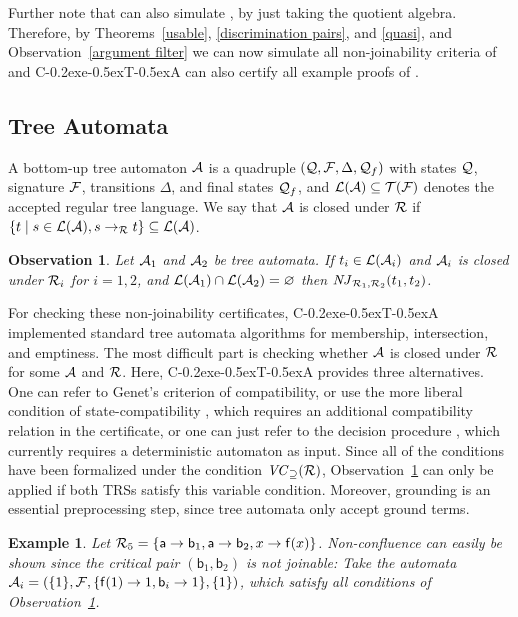 \documentclass[a4paper]{easychair}
\newtheorem{observation}[theorem]{Observation}
\newtheorem{example}[theorem]{Example}
\newcommand\ceta{\textsf{C\kern-0.2exe\kern-0.5exT\kern-0.5exA}\xspace}
\newcommand\TT{{\cal T}}
\newcommand\LL{{\cal L}}
\newcommand\AAA{{\cal A}}
\newcommand\QQ{{\cal Q}}
\newcommand\final{{\cal Q}_{f}}
\newcommand\FF{{\cal F}}
\newcommand\RR{{\cal R}}
\newcommand\njin[3]{\mathit{NJ}_{#1}(#2,#3)}
\newcommand\nj[4]{\njin{#1,#2}{#3}{#4}}
\newcommand\m[1]{\mathsf{#1}}
\newcommand\rObs[1]{Observation~\ref{#1}}
\newcommand{\vcsubset}[1]{\mathit{VC}_{\supseteq}(#1)}
\begin{document}
Further note that \cite[Corollary 6]{Aoto} can also simulate \cite[Theorem 5]{Aoto}, by just
taking the quotient algebra. Therefore, by Theorems~\ref{usable}, \ref{discrimination pairs}, and 
\ref{quasi}, and \rObs{argument filter}
we can now simulate all non-joinability criteria of \cite{Aoto} and \ceta can also certify all 
example proofs of \cite{Aoto}.

\subsection{Tree Automata}

A bottom-up tree automaton $\AAA$ is a quadruple $(\QQ,\FF,\Delta,\final)$ 
with states $\QQ$, signature $\FF$,
transitions $\Delta$, and final states $\final$, and $\LL(\AAA) \subseteq \TT(\FF)$ 
denotes the accepted regular tree language. We say that $\AAA$ is closed under $\RR$ if
$\{t \mid s \in \LL(\AAA), s \to_\RR t\} \subseteq \LL(\AAA)$.

\begin{observation}
\label{automata}
Let $\AAA_1$ and $\AAA_2$ be tree automata.
If $t_i \in \LL(\AAA_i)$ and $\AAA_i$ is closed under $\RR_i$ for $i = 1,2$, and
$\LL(\AAA_1) \cap \LL(\AAA_2) = \varnothing$ then $\nj{\RR_1}{\RR_2}{t_1}{t_2}$.
\end{observation}

For checking these non-joinability certificates, \ceta implemented standard tree automata algorithms
for membership, intersection, and emptiness. The most difficult part is checking whether
$\AAA$ is closed under $\RR$ for some $\AAA$ and $\RR$.
Here, \ceta provides three alternatives. One can refer to Genet's criterion 
of compatibility, or use the more liberal condition of state-compatibility \cite{BFRT-LATA14}, which 
requires an additional compatibility relation in the certificate, or one can just refer to
the decision procedure \cite{BFRT-LATA14}, which currently requires a deterministic automaton as input.
Since all of the conditions have been formalized under the condition $\vcsubset{\RR}$, 
\rObs{automata} can only be applied if both TRSs satisfy this variable condition.
Moreover, grounding is an essential preprocessing step, since tree automata only accept ground
terms.

\begin{example}
\label{aut ex}
Let $\RR_5 = \{\m a \to \m b_1, \m a \to \m b_2, x \to \m f(x)\}$.
Non-confluence can easily be shown since the critical pair $(\m b_1, \m b_2)$ is not joinable:
Take the automata $\AAA_i = (\{1\}, \FF, \{\m f(1) \to 1, \m b_i \to 1\}, \{1\})$, which
satisfy all conditions of \rObs{automata}. 
\end{example}
\end{document}
